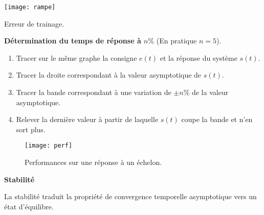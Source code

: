 \begin{marginfigure}[-2cm]
\texttt{[image: rampe]}
\caption{Erreur de trainage.}
\end{marginfigure}


\begin{methode}\textbf{Détermination du temps de réponse à $n\%$} (En pratique $n=5$).

\begin{enumerate}
 \item Tracer sur le même graphe la consigne $e(t)$ et la réponse du système
$s(t)$.
\item Tracer la droite correspondant à la valeur asymptotique de $s(t)$.
\item Tracer la bande correspondant à une variation de $\pm n\%$ de la valeur
asymptotique.
\item Relever la dernière valeur à partir de laquelle $s(t)$ coupe la bande et
n'en sort plus.
\end{enumerate}
\end{methode}


\begin{figure}[!h]
\centering
\texttt{[image: perf]}
\caption{Performances sur une réponse à un échelon.}
\end{figure}

\begin{defi}\textbf{Stabilité}

La stabilité traduit la propriété de convergence temporelle asymptotique vers
un état d'équilibre. 
\end{defi}



